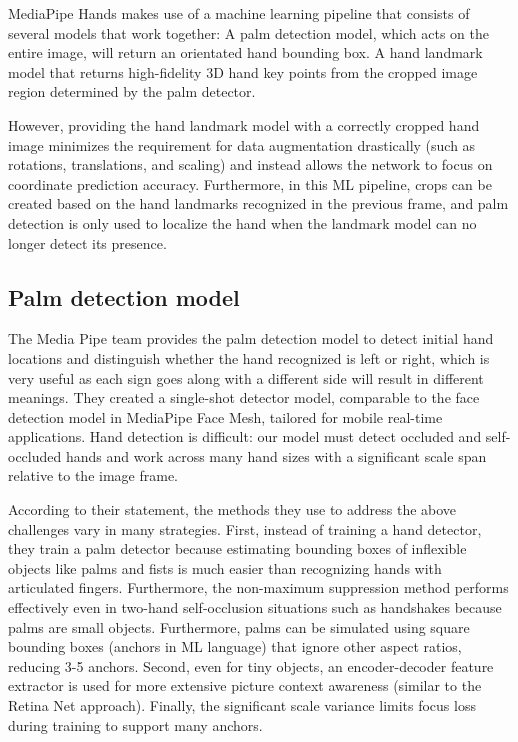         MediaPipe Hands makes use of a machine learning pipeline that consists of several models that work together: A palm detection model, which acts on the entire image, will return an orientated hand bounding box. A hand landmark model that returns high-fidelity 3D hand key points from the cropped image region determined by the palm detector.

        However, providing the hand landmark model with a correctly cropped hand image minimizes the requirement for data augmentation drastically (such as rotations, translations, and scaling) and instead allows the network to focus on coordinate prediction accuracy. Furthermore, in this ML pipeline, crops can be created based on the hand landmarks recognized in the previous frame, and palm detection is only used to localize the hand when the landmark model can no longer detect its presence.
      \subsection{ Palm detection model }
        The Media Pipe team provides the palm detection model to detect initial hand locations and distinguish whether the hand recognized is left or right, which is very useful as each sign goes along with a different side will result in different meanings. They created a single-shot detector model, comparable to the face detection model in MediaPipe Face Mesh, tailored for mobile real-time applications. Hand detection is difficult: our model must detect occluded and self-occluded hands and work across many hand sizes with a significant scale span relative to the image frame.
        
        According to their statement, the methods they use to address the above challenges vary in many strategies. First, instead of training a hand detector, they train a palm detector because estimating bounding boxes of inflexible objects like palms and fists is much easier than recognizing hands with articulated fingers. Furthermore, the non-maximum suppression method performs effectively even in two-hand self-occlusion situations such as handshakes because palms are small objects. Furthermore, palms can be simulated using square bounding boxes (anchors in ML language) that ignore other aspect ratios, reducing 3-5 anchors. Second, even for tiny objects, an encoder-decoder feature extractor is used for more extensive picture context awareness (similar to the Retina Net approach). Finally, the significant scale variance limits focus loss during training to support many anchors.

